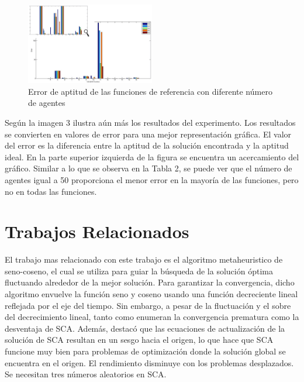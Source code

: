 \documentclass[conference]{IEEEtran}
\begin{document}
\begin{figure}[h!]
    \centering
    \includegraphics[width=0.5\textwidth, keepaspectratio]{Figures/image3.png}
    \caption{Error de aptitud de las funciones de referencia con diferente
        número de agentes
        \cite{aziz2022}}
    \label{fig:mi_etiqueta}
\end{figure}

Según \cite{aziz2022} la imagen 3 ilustra aún más los resultados del experimento. Los resultados se
convierten en valores de error para una mejor representación gráfica. El valor
del error es la diferencia entre la aptitud de la solución encontrada y la
aptitud ideal. En la parte superior izquierda de la figura se encuentra un
acercamiento del gráfico. Similar a lo que se observa en la Tabla 2, se puede
ver que el número de agentes igual a 50 proporciona el menor error en la
mayoría de las funciones, pero no en todas las funciones.

\section{Trabajos Relacionados}
\label{sec:TR}

El trabajo mas relacionado con este trabajo es el algoritmo metaheuristico de
seno-coseno, el cual se utiliza para guiar la búsqueda de la solución
óptima fluctuando alrededor de la mejor solución. Para garantizar la
convergencia, dicho algoritmo envuelve la función seno y coseno usando una
función
decreciente lineal reflejada por el eje del tiempo. Sin embargo, a pesar de la
fluctuación y el sobre del decrecimiento lineal, tanto
\cite{abualigah2021advances} como \cite{gabis2021comprehensive} enumeran
la convergencia prematura como la desventaja de SCA. Además,
\cite{askari2020critical} destacó que
las ecuaciones de actualización de la solución de SCA resultan en un sesgo
hacia el origen, lo que hace que SCA funcione muy bien para problemas de
optimización donde la solución global se encuentra en el origen.
El rendimiento disminuye con los problemas desplazados. Se necesitan tres
números aleatorios en SCA.
\end{document}
